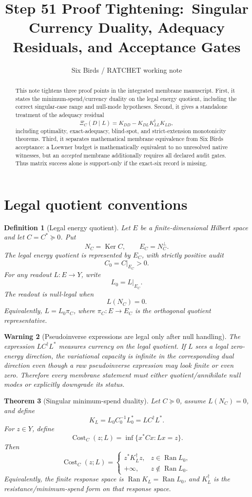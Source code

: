 \documentclass[11pt]{article}
\title{Step 51 Proof Tightening:\
Singular Currency Duality, Adequacy Residuals, and Acceptance Gates}
\author{Six Birds / RATCHET working note}
\date{}
\newtheorem{theorem}{Theorem}[section]
\newtheorem{definition}[theorem]{Definition}
\newtheorem{warning}[theorem]{Warning}
\DeclareMathOperator{\Ran}{Ran}
\DeclareMathOperator{\Ker}{Ker}
\DeclareMathOperator{\Cost}{Cost}
\begin{document}
\maketitle

\begin{abstract}
This note tightens three proof points in the integrated membrane manuscript.  First, it states the minimum-spend/currency duality on the legal energy quotient, including the correct singular-case range and null-mode hypotheses.  Second, it gives a standalone treatment of the adequacy residual
\[
  \Xi_C(D\mid L)
  =K_{DD}-K_{DL}K_{LL}^\dagger K_{LD},
\]
including optimality, exact-adequacy, blind-spot, and strict-extension monotonicity theorems.  Third, it separates mathematical membrane equivalence from Six Birds acceptance: a Loewner budget is mathematically equivalent to no unresolved native witnesses, but an \emph{accepted} membrane additionally requires all declared audit gates.  Thus matrix success alone is support-only if the exact-six record is missing.
\end{abstract}

\section{Legal quotient conventions}

\begin{definition}[Legal energy quotient]
Let \(E\) be a finite-dimensional Hilbert space and let \(C=C^*\succeq0\).  Put
\[
  N_C=\Ker C,
  \qquad
  E_C=N_C^\perp.
\]
The legal energy quotient is represented by \(E_C\), with strictly positive audit
\[
  C_0=C|_{E_C}>0.
\]
For any readout \(L:E\to Y\), write
\[
  L_0=L|_{E_C}.
\]
The readout is \emph{null-legal} when
\[
  L(N_C)=0.
\]
Equivalently, \(L=L_0\pi_C\), where \(\pi_C:E\to E_C\) is the orthogonal quotient representative.
\end{definition}

\begin{warning}[Pseudoinverse expressions are legal only after null handling]
The expression \(LC^\dagger L^*\) measures currency on the legal quotient.  If \(L\) sees a legal zero-energy direction, the variational capacity is infinite in the corresponding dual direction even though a raw pseudoinverse expression may look finite or even zero.  Therefore every membrane statement must either quotient/annihilate null modes or explicitly downgrade its status.
\end{warning}

\begin{theorem}[Singular minimum-spend duality]
Let \(C\succeq0\), assume \(L(N_C)=0\), and define
\[
  K_L=L_0C_0^{-1}L_0^*=LC^\dagger L^*.
\]
For \(z\in Y\), define
\[
  \Cost_C(z;L)=\inf\{x^*Cx: Lx=z\}.
\]
Then
\[
  \Cost_C(z;L)=
  \begin{cases}
    z^*K_L^\dagger z, & z\in\Ran L_0,\\
    +\infty, & z\notin\Ran L_0.
  \end{cases}
\]
Equivalently, the finite response space is \(\Ran K_L=\Ran L_0\), and \(K_L^\dagger\) is the resistance/minimum-spend form on that response space.
\end{theorem}
\end{document}
